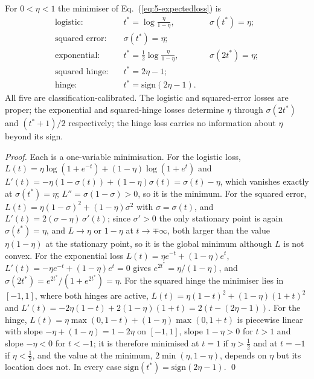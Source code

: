 \begin{proposition}
\label{prop:5-bayeslosses}
For $0<\eta<1$ the minimiser of Eq.~(\ref{eq:5-expectedloss}) is
\begin{align}
  \text{logistic:}\quad
    &t^{*}=\log\frac{\eta}{1-\eta},
    &&\sigma(t^{*})=\eta;
  \label{eq:5-bayeslogistic}\\
  \text{squared error:}\quad
    &\sigma(t^{*})=\eta;
  \label{eq:5-bayessquared}\\
  \text{exponential:}\quad
    &t^{*}=\tfrac12\log\frac{\eta}{1-\eta},
    &&\sigma(2t^{*})=\eta;
  \label{eq:5-bayesexp}\\
  \text{squared hinge:}\quad
    &t^{*}=2\eta-1;
  \label{eq:5-bayessqhinge}\\
  \text{hinge:}\quad
    &t^{*}=\mathrm{sign}(2\eta-1).
  \label{eq:5-bayeshinge}
\end{align}
All five are classification-calibrated.  The logistic and squared-error
losses are proper; the exponential and squared-hinge losses determine $\eta$
through $\sigma(2t^{*})$ and $(t^{*}+1)/2$ respectively; the hinge loss
carries no information about $\eta$ beyond its sign.
\end{proposition}

\begin{proof}
Each is a one-variable minimisation.  For the logistic loss,
$L(t)=\eta\log(1+e^{-t})+(1-\eta)\log(1+e^{t})$ and
$L'(t)=-\eta(1-\sigma(t))+(1-\eta)\sigma(t)=\sigma(t)-\eta$, which vanishes
exactly at $\sigma(t^{*})=\eta$; $L''=\sigma(1-\sigma)>0$, so it is the
minimum.  For the squared error,
$L(t)=\eta(1-\sigma)^{2}+(1-\eta)\sigma^{2}$ with $\sigma=\sigma(t)$, and
$L'(t)=2(\sigma-\eta)\,\sigma'(t)$; since $\sigma'>0$ the only stationary
point is again $\sigma(t^{*})=\eta$, and $L\to\eta$ or $1-\eta$ at
$t\to\mp\infty$, both larger than the value $\eta(1-\eta)$ at the stationary
point, so it is the global minimum although $L$ is not convex.  For the
exponential loss $L(t)=\eta e^{-t}+(1-\eta)e^{t}$, $L'(t)=-\eta e^{-t}
+(1-\eta)e^{t}=0$ gives $e^{2t^{*}}=\eta/(1-\eta)$, and
$\sigma(2t^{*})=e^{2t^{*}}/(1+e^{2t^{*}})=\eta$.  For the squared hinge the
minimiser lies in $[-1,1]$, where both hinges are active,
$L(t)=\eta(1-t)^{2}+(1-\eta)(1+t)^{2}$ and $L'(t)=-2\eta(1-t)+2(1-\eta)(1+t)
=2(t-(2\eta-1))$.  For the hinge, $L(t)=\eta\max(0,1-t)+(1-\eta)\max(0,1+t)$
is piecewise linear with slope $-\eta+(1-\eta)=1-2\eta$ on $[-1,1]$, slope
$1-\eta>0$ for $t>1$ and slope $-\eta<0$ for $t<-1$; it is therefore
minimised at $t=1$ if $\eta>\tfrac12$ and at $t=-1$ if $\eta<\tfrac12$, and
the value at the minimum, $2\min(\eta,1-\eta)$, depends on $\eta$ but its
location does not.  In every case $\mathrm{sign}(t^{*})=\mathrm{sign}(2\eta-1)$.
\qed
\end{proof}

